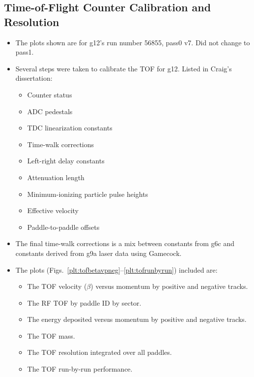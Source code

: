 \subsection{\label{sec:calib.tof}Time-of-Flight Counter Calibration and Resolution}

\begin{itemize}
    \item The plots shown are for g12's run number 56855, pass0 v7. Did not change to pass1.
    \item Several steps were taken to calibrate the TOF for g12. Listed in Craig's dissertation\cite{clas.thesis.bookwalter}:
    \begin{itemize}
        \item Counter status
        \item ADC pedestals
        \item TDC linearization constants
        \item Time-walk corrections
        \item Left-right delay constants
        \item Attenuation length
        \item Minimum-ionizing particle pulse heights
        \item Effective velocity
        \item Paddle-to-paddle offsets
    \end{itemize}
    \item The final time-walk corrections is a mix between constants from g6c and constants derived from g9a laser data using Gamecock.
    \item The plots (Figs.~\ref{plt:tofbetavpneg}--\ref{plt:tofrunbyrun}) included are:
    \begin{itemize}
        \item The TOF velocity ($\beta$) versus momentum by positive and negative tracks.
        \item The RF TOF by paddle ID by sector.
        \item The energy deposited versus momentum by positive and negative tracks.
        \item The TOF mass.
        \item The TOF resolution integrated over all paddles.
        \item The TOF run-by-run performance.
    \end{itemize}
\end{itemize}

